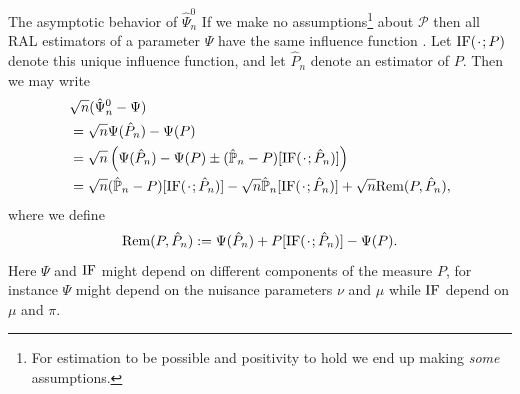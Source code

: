 \documentclass[smaller]{beamer}\usepackage{listings}
\begin{document}
\begin{frame}[label={sec:org7005a15}]{The asymptotic behavior of \(\hat\Psi_n^0\)}
\small If we make no assumptions\footnote{For estimation to be possible and positivity to hold we end up making \emph{some} assumptions.} about \(\mathcal{P}\) then all RAL estimators of a parameter
\(\Psi\) have the same influence function \citep{kennedy2016semiparametric}. Let \(\ic(\blank;P)\) denote this
unique influence function, and let \(\hat P_n\) denote an estimator of \(P\). Then we may write
\begin{align*}
  & \sqrt{n}(\hat{\Psi}_n^0 - \Psi)
  \\
  & = \sqrt{n}
    \Psi(\hat P_n) - \Psi(P)
  \\
  &  = \sqrt{n}
    \left(
    \Psi(\hat P_n) - \Psi(P)
    \pm
    (\empmeas-P)[\ic(\blank; \hat P_n)]
    \right)
  \\
  &  = \sqrt{n}(\empmeas-P)[\ic(\blank; \hat P_n)]
    - \sqrt{n}\empmeas[\ic(\blank; \hat P_n)]
    + \sqrt{n}\mathrm{Rem}(P,  \hat P_n),
\end{align*}
where we define
\begin{equation*}
  \mathrm{Rem}(P,  \hat{P}_n)
  := \Psi(\hat P_n) 
  + P[\ic(\blank; \hat P_n)]
  - \Psi(P).
\end{equation*}
Here \(\Psi\) and \(\mathrm{IF}\) might depend on different components of the measure \(P\), for instance \(\Psi\)
might depend on the nuisance parameters \(\nu\) and \(\mu\) while \(\mathrm{IF}\) depend on \(\mu\) and \(\pi\).
\end{frame}
\end{document}
